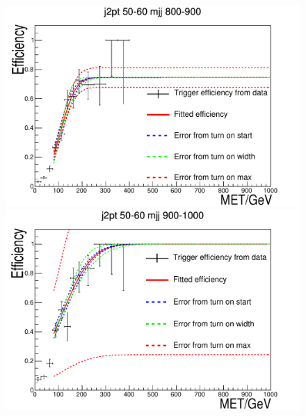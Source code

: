 \begin{figure}
  \begin{center}
    \includegraphics[width=.6\largefigwidth]{plots/parked/trigfitplots/hData_MET_1D_33D.pdf}
    \includegraphics[width=.6\largefigwidth]{plots/parked/trigfitplots/hData_MET_1D_34D.pdf}


\end{center}
\end{figure}
